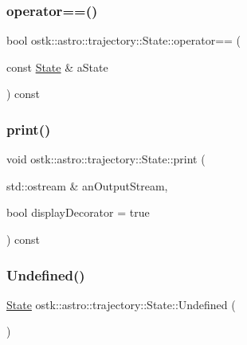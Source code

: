 \subsubsection{\texorpdfstring{operator==()}{operator==()}}
{\footnotesize\ttfamily bool ostk\+::astro\+::trajectory\+::\+State\+::operator== (\begin{DoxyParamCaption}\item[{const \hyperlink{classostk_1_1astro_1_1trajectory_1_1_state}{State} \&}]{a\+State }\end{DoxyParamCaption}) const}

\mbox{\label{classostk_1_1astro_1_1trajectory_1_1_state_a0072b543bbac1abe5e94609c74491b5d}} 
\subsubsection{\texorpdfstring{print()}{print()}}
{\footnotesize\ttfamily void ostk\+::astro\+::trajectory\+::\+State\+::print (\begin{DoxyParamCaption}\item[{std\+::ostream \&}]{an\+Output\+Stream,  }\item[{bool}]{display\+Decorator = {\ttfamily true} }\end{DoxyParamCaption}) const}

\mbox{\label{classostk_1_1astro_1_1trajectory_1_1_state_ab6ed6a252eeac1d24cf3b5c65ec0c6b6}} 
\subsubsection{\texorpdfstring{Undefined()}{Undefined()}}
{\footnotesize\ttfamily \hyperlink{classostk_1_1astro_1_1trajectory_1_1_state}{State} ostk\+::astro\+::trajectory\+::\+State\+::\+Undefined (\begin{DoxyParamCaption}{ }\end{DoxyParamCaption})\hspace{0.3cm}{\ttfamily [static]}}




